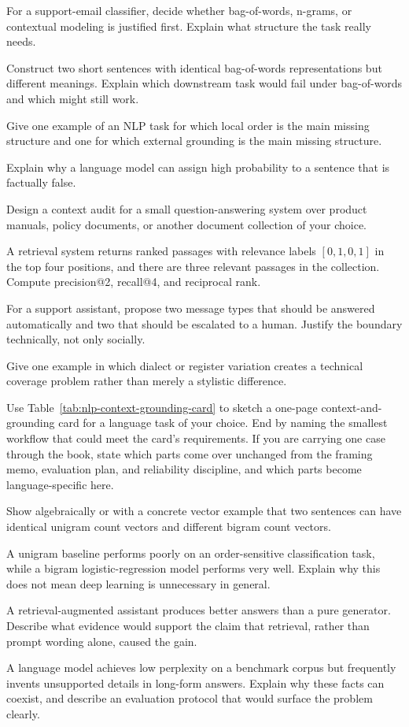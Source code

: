 \begin{exercises}
\item For a support-email classifier, decide whether bag-of-words, n-grams, or contextual modeling is justified first. Explain what structure the task really needs.
\item Construct two short sentences with identical bag-of-words representations but different meanings. Explain which downstream task would fail under bag-of-words and which might still work.
\item Give one example of an NLP task for which local order is the main missing structure and one for which external grounding is the main missing structure.
\item Explain why a language model can assign high probability to a sentence that is factually false.
\item Design a context audit for a small question-answering system over product manuals, policy documents, or another document collection of your choice.
\item A retrieval system returns ranked passages with relevance labels $[0,1,0,1]$ in the top four positions, and there are three relevant passages in the collection. Compute precision@2, recall@4, and reciprocal rank.
\item For a support assistant, propose two message types that should be answered automatically and two that should be escalated to a human. Justify the boundary technically, not only socially.
\item Give one example in which dialect or register variation creates a technical coverage problem rather than merely a stylistic difference.
\item Use Table~\ref{tab:nlp-context-grounding-card} to sketch a one-page context-and-grounding card for a language task of your choice. End by naming the smallest workflow that could meet the card's requirements. If you are carrying one case through the book, state which parts come over unchanged from the framing memo, evaluation plan, and reliability discipline, and which parts become language-specific here.
\end{exercises}

\begin{challengeexercises}
\item Show algebraically or with a concrete vector example that two sentences can have identical unigram count vectors and different bigram count vectors.
\item A unigram baseline performs poorly on an order-sensitive classification task, while a bigram logistic-regression model performs very well. Explain why this does not mean deep learning is unnecessary in general.
\item A retrieval-augmented assistant produces better answers than a pure generator. Describe what evidence would support the claim that retrieval, rather than prompt wording alone, caused the gain.
\item A language model achieves low perplexity on a benchmark corpus but frequently invents unsupported details in long-form answers. Explain why these facts can coexist, and describe an evaluation protocol that would surface the problem clearly.
\end{challengeexercises}
